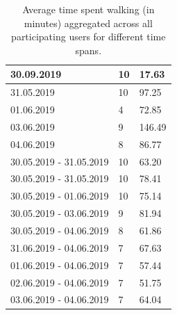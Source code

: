 \begin{table}[]
{\begin{tabular}{|l|l|l|}
			30.09.2019                 & 10         & 17.63                    \\ \hline
			31.05.2019                 & 10         & 97.25                    \\ \hline
			01.06.2019                 & 4          & 72.85                    \\ \hline
			03.06.2019                 & 9          & 146.49                   \\ \hline
			04.06.2019                 & 8          & 86.77                    \\ \hline
			30.05.2019 - 31.05.2019    & 10         & 63.20                    \\ \hline
			30.05.2019 - 31.05.2019    & 10         & 78.41                    \\ \hline
			30.05.2019 - 01.06.2019    & 10         & 75.14                    \\ \hline
			30.05.2019 - 03.06.2019    & 9          & 81.94                    \\ \hline
			30.05.2019 - 04.06.2019    & 8          & 61.86                    \\ \hline
			31.06.2019 - 04.06.2019    & 7          & 67.63                    \\ \hline
			01.06.2019 - 04.06.2019    & 7          & 57.44                    \\ \hline
			02.06.2019 - 04.06.2019    & 7          & 51.75                    \\ \hline
			03.06.2019 - 04.06.2019    & 7          & 64.04                    \\ \hline
		\end{tabular}
		\caption{Average time spent walking (in minutes) aggregated across all participating users for different time spans.}
		\label{results-walking}
	}
\end{table}


